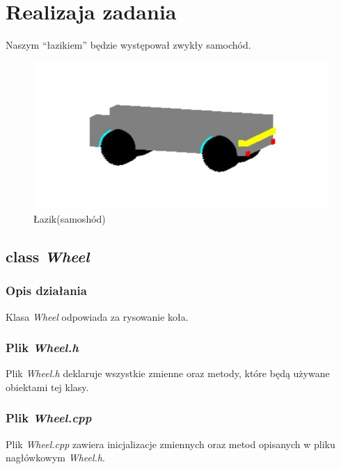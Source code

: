 \documentclass[a4paper, 12pt]{report}
\begin{document}
\section{Realizaja zadania}

Naszym ``łazikiem'' będzie występował zwykły samochód.

\begin{figure}[h]
		\centering
		\includegraphics{lazik.jpg}
		\caption{Łazik(samoshód)}
\end{figure}


\subsection{class \emph{Wheel}}
\subsubsection{Opis działania}

Klasa \emph{Wheel} odpowiada za rysowanie koła.

\subsubsection{Plik \emph{Wheel.h}}

Plik \emph{Wheel.h} deklaruje wszystkie zmienne oraz metody, które będą używane obiektami tej klasy.



\subsubsection{Plik \emph{Wheel.cpp}}

Plik \emph{Wheel.cpp} zawiera inicjalizacje zmiennych oraz metod opisanych w pliku nagłówkowym \emph{Wheel.h}.


\end{document}
